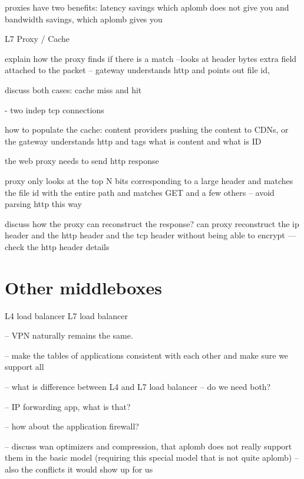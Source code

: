 proxies have two benefits: latency savings which aplomb does not give you 
and bandwidth savings, which aplomb gives you
 
L7 Proxy / Cache

explain how the proxy finds if there is  a match --looks at header bytes
extra field attached to the packet -- gateway understands http and points out file id, 

discuss both cases: cache miss and hit

- two indep tcp connections 

how to populate the cache: content providers pushing the content to CDNs, or the gateway understands
http and tags what is content and what is ID

the web proxy needs to send http response 

proxy only looks at the top N bits corresponding to a large header and matches the file id with the entire path
and matches GET and a few others -- avoid parsing http this way


discuss how the proxy can reconstruct the response?
can proxy reconstruct the ip header and the http header  and the tcp header without being able to encrypt
--- check the http header details


\section{Other middleboxes}\label{sec:vpn} \label{sec:other_apps} \label{sec:not_supp}\label{sec:loadb}


L4 load balancer
L7 load balancer

-- VPN naturally remains the same. 

-- make the tables of applications consistent with each other and make sure we support all 

-- what is difference between L4 and L7 load balancer -- do we need both?

-- IP forwarding app, what is that?

-- how about the application firewall?

-- discuss wan optimizers and compression, that aplomb does not really support them in the basic model (requiring this special model that is not quite aplomb) -- also the conflicts it would show up for us